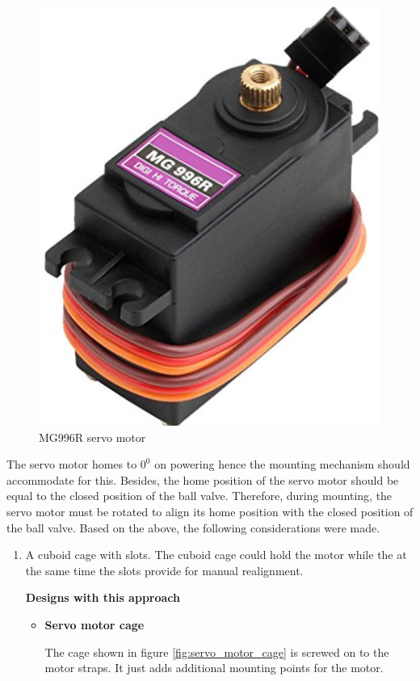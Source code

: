 \begin{enumerate}
\begin{enumerate}
\begin{table}[H]
\begin{tabular}{|l|l|}
    \end{tabular}
    \label{tab:MG996R_servo_specs}
    \end{table}
    \begin{figure}[H]
        \centering
        \includegraphics[width=.25\textwidth, height=.25\textheight]{Figures/MG996R.jpg}
        \caption[MG996R servo motor]{MG996R servo motor \cite{mg996r}}
        \label{fig:servo_motor_assembly}
    \end{figure}
    The servo motor homes to $0^{0}$ on powering hence the mounting mechanism should accommodate for this. Besides, the home position of the servo motor should be equal to the closed position of the ball valve. Therefore, during mounting, the servo motor must be rotated to align its home position with the closed position of the ball valve. Based on the above, the following considerations were made.
     \begin{enumerate}
         \item A  cuboid cage with slots. The cuboid cage could hold the motor while the at the same time the slots provide for manual realignment.
         \par
         \textbf{Designs with this approach}
         \par
         \begin{itemize}
             \item \textbf{Servo motor cage}
            \par
            The cage shown in figure \ref{fig:servo_motor_cage} is screwed on to the motor straps. It just adds additional mounting points for the motor. 
            \begin{figure}[H]

\end{figure}
\end{itemize}
\end{enumerate}
\end{enumerate}
\end{enumerate}
